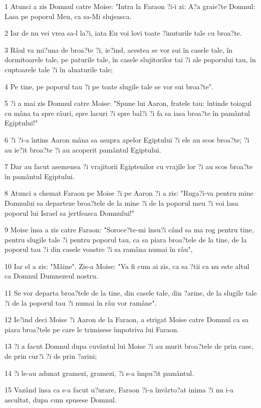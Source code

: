 \par 1 Atunci a zis Domnul catre Moise: "Intra la Faraon ?i-i zi: A?a graie?te Domnul: Lasa pe poporul Meu, ca sa-Mi slujeasca.
\par 2 Iar de nu vei vrea sa-l la?i, iata Eu voi lovi toate ?inuturile tale cu broa?te.
\par 3 Râul va mi?una de broa?te ?i, ie?ind, acestea se vor sui în casele tale, în dormitoarele tale, pe paturile tale, în casele slujitorilor tai ?i ale poporului tau, în cuptoarele tale ?i în aluaturile tale;
\par 4 Pe tine, pe poporul tau ?i pe toate slugile tale se vor sui broa?te".
\par 5 ?i a mai zis Domnul catre Moise: "Spune lui Aaron, fratele tau: întinde toiagul cu mâna ta spre râuri, spre lacuri ?i spre bal?i ?i fa sa iasa broa?te în pamântul Egiptului!"
\par 6 ?i ?i-a întins Aaron mâna sa asupra apelor Egiptului ?i ele au scos broa?te; ?i au ie?it broa?te ?i au acoperit pamântul Egiptului.
\par 7 Dar au facut asemenea ?i vrajitorii Egiptenilor cu vrajile lor ?i au scos broa?te în pamântul Egiptului.
\par 8 Atunci a chemat Faraon pe Moise ?i pe Aaron ?i a zis: "Ruga?i-va pentru mine Domnului sa departeze broa?tele de la mine ?i de la poporul meu ?i voi lasa poporul lui Israel sa jertfeasca Domnului!"
\par 9 Moise însa a zis catre Faraon: "Soroce?te-mi însu?i când sa ma rog pentru tine, pentru slugile tale ?i pentru poporul tau, ca sa piara broa?tele de la tine, de la poporul tau ?i din casele voastre ?i sa ramâna numai în râu",
\par 10 Iar el a zis: "Mâine". Zis-a Moise: "Va fi cum ai zis, ca sa ?tii ca nu este altul ca Domnul Dumnezeul nostru.
\par 11 Se vor departa broa?tele de la tine, din casele tale, din ?arine, de la slugile tale ?i de la poporul tau ?i numai în râu vor ramâne".
\par 12 Ie?ind deci Moise ?i Aaron de la Faraon, a strigat Moise catre Domnul ca sa piara broa?tele pe care le trimisese împotriva lui Faraon.
\par 13 ?i a facut Domnul dupa cuvântul lui Moise ?i au murit broa?tele de prin case, de prin cur?i ?i ds prin ?arini;
\par 14 ?i le-au adunat gramezi, gramezi, ?i s-a împu?it pamântul.
\par 15 Vazând însa ca s-a facut u?urare, Faraon ?i-a învârto?at inima ?i nu i-a ascultat, dupa cum spusese Domnul.
